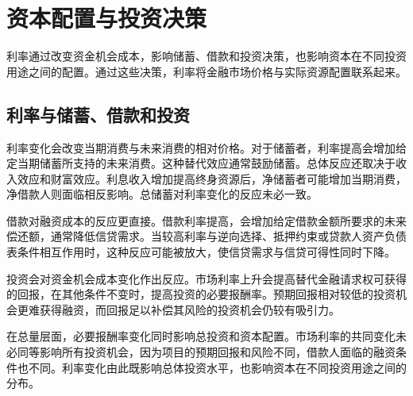 \section{资本配置与投资决策}

利率通过改变资金机会成本，影响储蓄、借款和投资决策，也影响资本在不同投资用途之间的配置。通过这些决策，利率将金融市场价格与实际资源配置联系起来。

\subsection{利率与储蓄、借款和投资}

利率变化会改变当期消费与未来消费的相对价格。对于储蓄者，利率提高会增加给定当期储蓄所支持的未来消费。这种替代效应通常鼓励储蓄。总体反应还取决于收入效应和财富效应。利息收入增加提高终身资源后，净储蓄者可能增加当期消费，净借款人则面临相反影响。总储蓄对利率变化的反应未必一致。

借款对融资成本的反应更直接。借款利率提高，会增加给定借款金额所要求的未来偿还额，通常降低信贷需求。当较高利率与逆向选择、抵押约束或贷款人资产负债表条件相互作用时，这种反应可能被放大，使信贷需求与信贷可得性同时下降。

投资会对资金机会成本变化作出反应。市场利率上升会提高替代金融请求权可获得的回报，在其他条件不变时，提高投资的必要报酬率。预期回报相对较低的投资机会更难获得融资，而回报足以补偿其风险的投资机会仍较有吸引力。

在总量层面，必要报酬率变化同时影响总投资和资本配置。市场利率的共同变化未必同等影响所有投资机会，因为项目的预期回报和风险不同，借款人面临的融资条件也不同。利率变化由此既影响总体投资水平，也影响资本在不同投资用途之间的分布。

